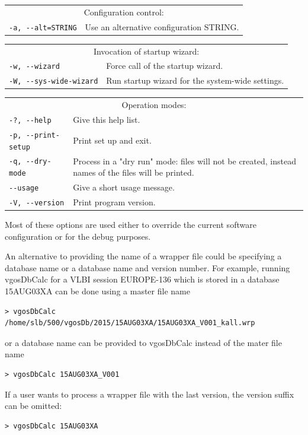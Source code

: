 \documentclass [10pt,letterpaper]{report}
\begin{document}
\begin{tabular}{p{\leftSp}p{\riteSp}}
\multicolumn{2}{c}{Configuration control:}\\
{\tt -a, -{}-alt=STRING}        & Use an alternative configuration STRING.\\
\end{tabular}
\vspace{5mm}

\begin{tabular}{p{\leftSp}p{\riteSp}}
\multicolumn{2}{c}{Invocation of startup wizard:}\\
{\tt -w, -{}-wizard}            & Force call of the startup wizard.\\
{\tt -W, -{}-sys-wide-wizard}   & Run startup wizard for the system-wide settings.\\
\end{tabular}
\vspace{5mm}

\begin{tabular}{p{\leftSp}p{\riteSp}}
\multicolumn{2}{c}{Operation modes:}\\
{\tt -?, -{}-help}              & Give this help list.\\
{\tt -p, -{}-print-setup}       & Print set up and exit.\\
{\tt -q, -{}-dry-mode}          & Process in a "dry run" mode: files will not be created, instead names of the files will be printed.\\
{\tt     -{}-usage}             & Give a short usage message.\\
{\tt -V, -{}-version}           & Print program version.\\
\end{tabular}
\vspace{5mm}


\noindent
Most of these options are used either to override the current software configuration
or for the debug purposes.

An alternative to providing the name of a wrapper file could be specifying
a database name or a database name and version number. For example, running
vgosDbCalc for a VLBI session EUROPE-136 which is stored in a database 15AUG03XA
can be done using a master file name
\begin{verbatim}
> vgosDbCalc /home/slb/500/vgosDb/2015/15AUG03XA/15AUG03XA_V001_kall.wrp
\end{verbatim}
or a database name can be provided to vgosDbCalc instead of the mater file name
\begin{verbatim}
> vgosDbCalc 15AUG03XA_V001
\end{verbatim}
If a user wants to process a wrapper file with the last version, the version suffix
can be omitted:
\begin{verbatim}
> vgosDbCalc 15AUG03XA
\end{verbatim}
\end{document}
